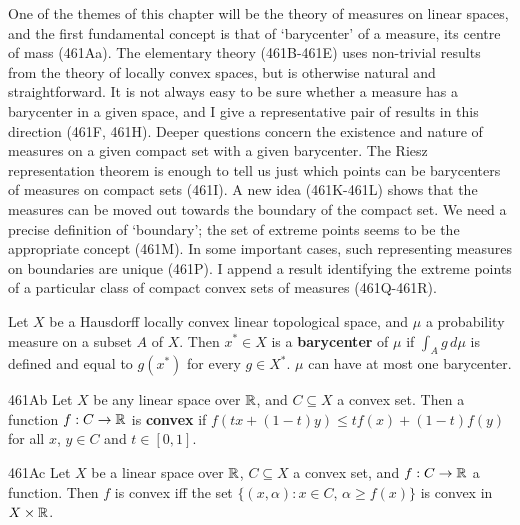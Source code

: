 
\def\chaptername{Pointwise compact sets of measurable functions}
\def\sectionname{Barycenters and Choquet's theorem}


One of the themes of this chapter will be the theory of measures on
linear spaces, and the first fundamental concept is that of `barycenter'
of a measure, its centre of mass (461Aa).   The elementary theory
(461B-461E) uses non-trivial results from the theory of locally convex
spaces, but is otherwise natural and straightforward.
It is not always easy to be sure whether a measure has a barycenter in a
given space, and I give a representative pair of results in this
direction (461F, 461H).   Deeper questions concern the existence and
nature of measures on a given compact set with a given barycenter.   The
Riesz representation theorem is enough to tell us just which points can
be barycenters of measures on compact sets (461I).   A new idea (461K-461L)
shows that the measures can be moved out towards the boundary of the
compact set.   We need a precise definition of `boundary';  the set of
extreme points seems to be the appropriate concept (461M).
In some important cases, such representing measures on boundaries are
unique (461P).   I append a result
identifying the extreme points of a particular class of compact convex sets
of measures (461Q-461R).


 Let $X$ be a Hausdorff locally convex
linear topological space, and $\mu$ a probability measure on a subset
$A$ of $X$.   Then $x^*\in X$ is a {\bf barycenter} of $\mu$ if
$\int_Ag\,d\mu$ is defined and equal to $g(x^*)$ for every $g\in X^*$.
 $\mu$ can
have at most one barycenter.

\spheader 461Ab Let $X$ be any linear space over $\Bbb R$,
and $C\subseteq X$ a
convex set.   Then a function
$f:C\to\Bbb R$ is {\bf convex} if
$f(tx+(1-t)y)\le tf(x)+(1-t)f(y)$ for all $x$,
$y\in C$ and $t\in[0,1]$.   

\spheader 461Ac
Let $X$ be a linear space over $\Bbb R$, $C\subseteq X$ a convex set,
and $f:C\to\Bbb R$ a function.   Then $f$ is convex iff the set
$\{(x,\alpha):x\in C$, $\alpha\ge f(x)\}$ is convex in
$X\times\Bbb R$.

